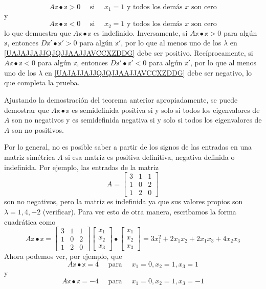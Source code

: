 \begin{theorem}
\begin{enumerate}[label=\roman*)]
        $$A\mathbb{x} \bullet \mathbb{x} > 0 \quad \text{ si } \quad x_1 = 1 \text{ y todos los demás } x \text{ son cero}$$
        y
        $$A\mathbb{x} \bullet \mathbb{x} < 0 \quad \text{ si } \quad x_2 = 1 \text{ y todos los demás } x \text{ son cero}$$
        lo que demuestra que $A\mathbb{x} \bullet \mathbb{x}$ es indefinido. Inversamente, si $A\mathbb{x} \bullet \mathbb{x} > 0$ para algún $\mathbb{x}$, entonces $D\mathbb{x}' \bullet \mathbb{x}' > 0$ para algún $\mathbb{x}'$, por lo que al menos uno de los $\lambda$ en \eqref{UAJAJJAJJQJQJJAAJJAVCCXZDDG} debe ser positivo. Recíprocamente, si $A\mathbb{x} \bullet \mathbb{x} < 0$ para algún $\mathbb{x}$, entonces $D\mathbb{x}' \bullet \mathbb{x}' < 0$ para algún $\mathbb{x}'$, por lo que al menos uno de los $\lambda$ en \eqref{UAJAJJAJJQJQJJAAJJAVCCXZDDG} debe ser negativo, lo que completa la prueba.
    \end{enumerate}
\end{theorem}

Ajustando la demostración del teorema anterior apropiadamente, se puede demostrar que $A\mathbb{x} \bullet \mathbb{x}$ es semidefinida positiva si y solo si todos los eigenvalores de $A$ son no negativos y es semidefinida negativa si y solo si todos los eigenvalores de $A$ son no positivos.

\begin{example}
    Por lo general, no es posible saber a partir de los signos de las entradas en una matriz simétrica $A$ si esa matriz es positiva definitiva, negativa definida o indefinida. Por ejemplo, las entradas de la matriz
    $$A = \begin{bmatrix}
        3 & 1 & 1 \\
        1 & 0 & 2 \\
        1 & 2 & 0
    \end{bmatrix}$$
    son no negativos, pero la matriz es indefinida ya que sus valores propios son $\lambda = 1, 4, -2$ (verificar). Para ver esto de otra manera, escribamos la forma cuadrática como
    $$A\mathbb{x} \bullet \mathbb{x} = \begin{bmatrix}
        3 & 1 & 1 \\
        1 & 0 & 2 \\
        1 & 2 & 0
    \end{bmatrix} \begin{bmatrix}
        x_1 \\
        x_2 \\
        x_3
    \end{bmatrix} \bullet \begin{bmatrix}
        x_1 \\
        x_2 \\
        x_3
    \end{bmatrix} = 3x_1^2 + 2x_1x_2 + 2x_1x_3 + 4x_2x_3$$
    Ahora podemos ver, por ejemplo, que
    $$A\mathbb{x} \bullet \mathbb{x} = 4 \quad \text{ para } \quad x_1 = 0, x_2 = 1, x_3 = 1$$
    y
    $$A\mathbb{x} \bullet \mathbb{x} = -4 \quad \text{ para } \quad x_1 = 0, x_2 = 1, x_3 = -1$$
\end{example}

